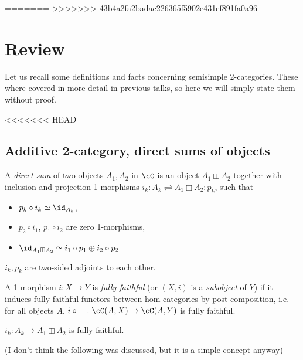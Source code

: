 \documentclass[12pt]{article}
\begin{document}
=======
>>>>>>> 43b4a2fa2badac226365f5902e431ef891fa0a96
\section{Review}

Let us recall some definitions and facts concerning
semisimple 2-categories.
These where covered in more detail in previous talks,
so here we will simply state them without proof.

<<<<<<< HEAD
\subsection{Additive 2-category, direct sums of objects}

\begin{definition}
A \emph{direct sum} of two objects $A_1,A_2$ in $\cC$
is an object $A_1 \boxplus A_2$ together with
inclusion and projection 1-morphisms
$i_k : A_k \rightleftharpoons A_1 \boxplus A_2 : p_k$,
such that
\begin{itemize}
\item $p_k \circ i_k \simeq \id_{A_k}$,
\item $p_2 \circ i_1$, $p_1 \circ i_2$ are zero 1-morphisms,
\item $\id_{A_1 \boxplus A_2} \simeq
	i_1 \circ p_1 \oplus i_2 \circ p_2$
\end{itemize}
\end{definition}

\begin{proposition}
$i_k,p_k$ are two-sided adjoints to each other.
\end{proposition}


\begin{definition}
A 1-morphism $i: X \to Y$ is \emph{fully faithful}
(or $(X,i)$ is a \emph{subobject} of $Y$)
if it induces fully faithful functors between hom-categories
by post-composition, i.e. for all objects $A$,
$i \circ - : \cC(A,X) \to \cC(A,Y)$
is fully faithful.
\end{definition}

\begin{proposition}
$i_k: A_k \to A_1 \boxplus A_2$ is fully faithful.
\end{proposition}



(I don't think the following was discussed,
but it is a simple concept anyway)
\end{document}
